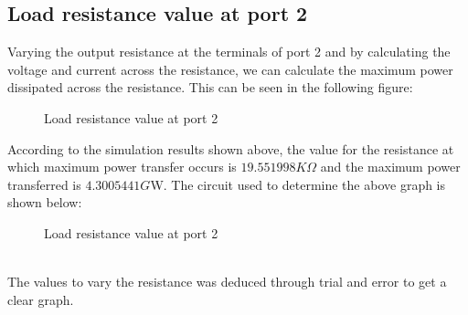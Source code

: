 \documentclass{report}[12pt]
\begin{document}
\subsection*{Load resistance value at port 2}
Varying the output resistance at the terminals of port 2 and by calculating the voltage and current across the resistance, we can calculate the maximum power dissipated across the resistance.
This can be seen in the following figure:
\begin{center}
    \begin{figure}[ht]
        \centering
        \caption{Load resistance value at port 2}
    \end{figure}
\end{center}
According to the simulation results shown above, the value for the resistance at which maximum power transfer occurs is $19.551998K\Omega$ and the maximum power transferred is $4.3005441G$W.
The circuit used to determine the above graph is shown below:
\begin{figure}[ht]
    \centering
    \caption{Load resistance value at port 2}
\end{figure}\\
The values to vary the resistance was deduced through trial and error to get a clear graph.
\end{document}

